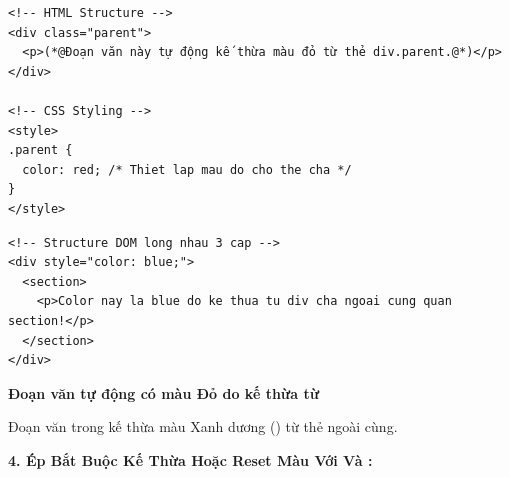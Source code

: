 \begin{codeWindow}
\begin{lstlisting}[language=HTML5]
<!-- HTML Structure -->
<div class="parent">
  <p>(*@Đoạn văn này tự động kế thừa màu đỏ từ thẻ div.parent.@*)</p>
</div>

<!-- CSS Styling -->
<style>
.parent {
  color: red; /* Thiet lap mau do cho the cha */
}
</style>
\end{lstlisting}
\end{codeWindow}

\begin{codeWindow}
\begin{lstlisting}[language=HTML5]
<!-- Structure DOM long nhau 3 cap -->
<div style="color: blue;">
  <section>
    <p>Color nay la blue do ke thua tu div cha ngoai cung quan section!</p>
  </section>
</div>
\end{lstlisting}
\end{codeWindow}

\begin{browserWindow}
\vspace{2pt}
\begin{tcolorbox}[
    enhanced,
    colback=white,
    colframe=gray!30,
    arc=6pt, boxrule=0.8pt,
    top=10pt, bottom=10pt, left=12pt, right=12pt
]
  {\sffamily\bfseries\color{red!80!black} Đoạn văn tự động có màu Đỏ do kế thừa từ }\\[6pt]
  
  \begin{tcolorbox}[colback=blue!5, colframe=blue!40, arc=4pt, boxrule=0.6pt, top=6pt, bottom=6pt, left=8pt, right=8pt, fontupper=\sffamily\bfseries\color{blue!80!black}]
    Đoạn văn trong  kế thừa màu Xanh dương () từ thẻ  ngoài cùng.
  \end{tcolorbox}
\end{tcolorbox}
\end{browserWindow}

\textbf{4. Ép Bắt Buộc Kế Thừa Hoặc Reset Màu Với  Và :}

